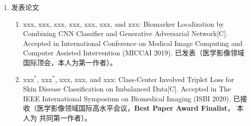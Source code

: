 \begin{enumerate}
	\item {\heiti 发表论文}
	\begin{enumerate}
		\item xxx, xxx, xxx, xxx, xxx, xxx, and xxx: Biomarker Localization by Combining CNN Classifier and Generative Adversarial Network[C]. Accepted in International Conference on Medical Image Computing and Computer Assisted Intervention (MICCAI 2019). {\heiti 已发表（医学影像领域国际顶会，本人为第一作者）}。
		\item xxx$^*$, xxx$^*$, xxx, xxx, and xxx: Class-Center Involved Triplet Loss  for Skin Disease Classification on Imbalanced Data[C]. Accepted in The IEEE International Symposium on Biomedical Imaging (ISBI 2020). {\heiti 已接收（医学影像领域国际高水平会议}，\textbf{Best Paper Award Finalist}， {\heiti 本人为} {\heiti 共同第一作者）。}
	\end{enumerate}
	
\end{enumerate}